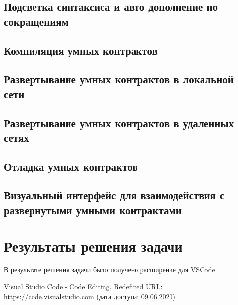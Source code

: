\documentclass[a4paper,12pt]{diplom}
\begin{document}
\section{Подсветка синтаксиса и авто дополнение по сокращениям}

\section{Компиляция умных контрактов}

\section{Развертывание умных контрактов в локальной сети}

\section{Развертывание умных контрактов в удаленных сетях}

\section{Отладка умных контрактов}

\section{Визуальный интерфейс для взаимодействия с развернутыми умными контрактами}

\chapter{Результаты решения задачи}

В результате решения задачи было получено расширение для VSCode


\renewcommand{\bibname}{Список литературы} 
\begin{thebibliography}{9}

Visual Studio Code - Code Editing. Redefined
URL: https://code.visualstudio.com
(дата доступа: 09.06.2020)

\end{thebibliography}
\end{document}
